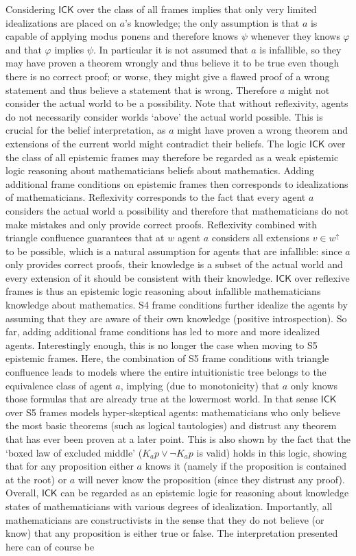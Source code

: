 \documentclass{myifcolog}
\newcommand{\agi}{a}
\newcommand{\ICK}{\mathsf{ICK}}
\numberwithin{theorem}{section}
\begin{document}
Considering $\ICK$ over the class of all frames implies that only very limited idealizations are placed on $\agi$'s knowledge; the only assumption is that $\agi$ is capable of applying modus ponens and therefore knows $\psi$ whenever they knows $\varphi$ and that $\varphi$ implies $\psi$. In particular it is not assumed that $\agi$ is infallible, so they may have proven a theorem wrongly and thus believe it to be true even though there is no correct proof; or worse, they might give a flawed proof of a wrong statement and thus believe a statement that is wrong. Therefore $\agi$ might not consider the actual world to be a possibility. Note that without reflexivity, agents do not necessarily consider worlds `above' the actual world possible. This is crucial for the belief interpretation, as $\agi$ might have proven a wrong theorem and extensions of the current world might contradict their beliefs. The logic $\ICK$ over the class of all epistemic frames may therefore be regarded as a weak epistemic logic reasoning about mathematicians beliefs about mathematics. Adding additional frame conditions on epistemic frames then corresponds to idealizations of mathematicians. Reflexivity corresponds to the fact that every agent $\agi$ considers the actual world a possibility and therefore that mathematicians do not make mistakes and only provide correct proofs. Reflexivity combined with triangle confluence guarantees that at $w$ agent $\agi$ considers all extensions $v \in w^\uparrow$ to be possible, which is a natural assumption for agents that are infallible: since $\agi$ only provides correct proofs, their knowledge is a subset of the actual world and every extension of it should be consistent with their knowledge. $\ICK$ over reflexive frames is thus an epistemic logic reasoning about infallible mathematicians knowledge about mathematics. S4 frame conditions further idealize the agents by assuming that they are aware of their own knowledge (positive introspection). So far, adding additional frame conditions has led to more and more idealized agents. Interestingly enough, this is no longer the case when moving to S5 epistemic frames. Here, the combination of S5 frame conditions with triangle confluence leads to models where the entire intuitionistic tree belongs to the equivalence class of agent $\agi$, implying (due to monotonicity) that $\agi$ only knows those formulas that are already true at the lowermost world. In that sense $\ICK$ over S5 frames models hyper-skeptical agents: mathematicians who only believe the most basic theorems (such as logical tautologies) and distrust any theorem that has ever been proven at a later point. This is also shown by the fact that the `boxed law of excluded middle' ($K_\agi p \vee \neg K_\agi p$ is valid) holds in this logic, showing that for any proposition either $\agi$ knows it (namely if the proposition is contained at the root) or $\agi$ will never know the proposition (since they distrust any proof). Overall, $\ICK$ can be regarded as an epistemic logic for reasoning about knowledge states of mathematicians with various degrees of idealization. Importantly, all mathematicians are constructivists in the sense that they do not believe (or know) that any proposition is either true or false. The interpretation presented here can of course be 
\end{document}
